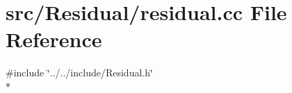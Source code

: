 \section{src/\-Residual/residual.cc File Reference}
\label{residual_8cc}
{\ttfamily \#include \char`\"{}../../include/\-Residual.\-h\char`\"{}}\\*
